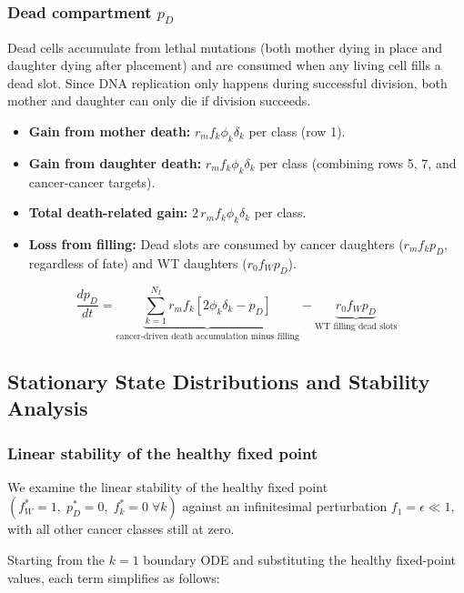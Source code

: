 \documentclass[11pt,a4paper]{article}
\begin{document}
\subsubsection*{Dead compartment $p_D$}

Dead cells accumulate from lethal mutations (both mother dying in place and daughter dying after placement) and are consumed when any living cell fills a dead slot. Since DNA replication only happens during successful division, both mother and daughter can only die if division succeeds.

\begin{itemize}
    \item \textbf{Gain from mother death:} $r_m f_k \phi_k \delta_k$ per class (row 1).
    \item \textbf{Gain from daughter death:} $r_m f_k \phi_k \delta_k$ per class (combining rows 5, 7, and cancer-cancer targets).
    \item \textbf{Total death-related gain:} $2\, r_m f_k \phi_k \delta_k$ per class.
    \item \textbf{Loss from filling:} Dead slots are consumed by cancer daughters ($r_m f_k p_D$, regardless of fate) and WT daughters ($r_0 f_W p_D$).
\end{itemize}

\begin{equation}
    \frac{dp_D}{dt} = \underbrace{\sum_{k=1}^{N_I} r_m f_k \left[ 2 \phi_k \delta_k - p_D \right]}_{\text{cancer-driven death accumulation minus filling}} - \underbrace{r_0 f_W p_D}_{\text{WT filling dead slots}}
\end{equation}

\subsection{Stationary State Distributions and Stability Analysis}

\subsubsection*{Linear stability of the healthy fixed point}

We examine the linear stability of the healthy fixed point $(f_W^* = 1,\; p_D^* = 0,\; f_k^* = 0\;\forall k)$ against an infinitesimal perturbation $f_1 = \epsilon \ll 1$, with all other cancer classes still at zero.

Starting from the $k=1$ boundary ODE and substituting the healthy fixed-point values, each term simplifies as follows:
\end{document}
